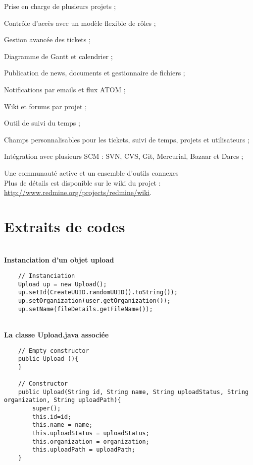 \begin{itemsize}
\item Prise en charge de plusieurs projets ;
\item Contrôle d’accès avec un modèle flexible de rôles ;
\item Gestion avancée des tickets ;
\item Diagramme de Gantt et calendrier ;
\item Publication de news, documents et gestionnaire de fichiers ;
\item Notifications par emails et flux ATOM ;
\item Wiki et forums par projet ;
\item Outil de suivi du temps ;
\item Champs personnalisables pour les tickets, suivi de temps, projets et utilisateurs ;
\item Intégration avec plusieurs SCM : SVN, CVS, Git, Mercurial, Bazaar et Darcs ;
\item Une communauté active et un ensemble d’outils connexes
\\

Plus de détails est disponible sur le wiki du projet : \url{http://www.redmine.org/projects/redmine/wiki}.

\pagebreak

\section{Extraits de codes}\label{Annexe D}\\

\textbf{Instanciation d'un objet upload}\\
\begin{lstlisting}
	// Instanciation
	Upload up = new Upload();
	up.setId(CreateUUID.randomUUID().toString());
	up.setOrganization(user.getOrganization());
	up.setName(fileDetails.getFileName());
\end{lstlisting} \\

\textbf{La classe Upload.java associée}\\

\begin{lstlisting}
	// Empty constructor
	public Upload (){
	}

    // Constructor
    public Upload(String id, String name, String uploadStatus, String organization, String uploadPath){
        super();
        this.id=id;
        this.name = name;
        this.uploadStatus = uploadStatus;
        this.organization = organization;
        this.uploadPath = uploadPath;
    }
    

\end{lstlisting}
\end{itemsize}

